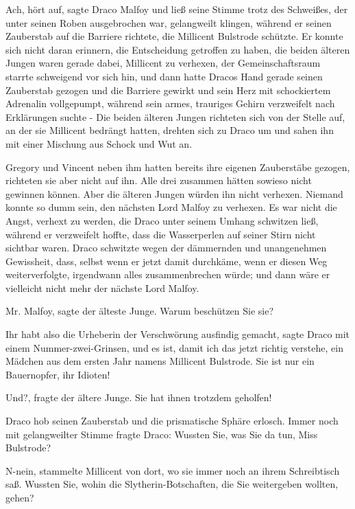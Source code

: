 \glqq{}Ach, hört auf\grqq{}, sagte Draco Malfoy und ließ seine Stimme trotz des
Schweißes, der unter seinen Roben ausgebrochen war, gelangweilt klingen, während
er seinen Zauberstab auf die Barriere richtete, die Millicent Bulstrode
schützte. Er konnte sich nicht daran erinnern, die Entscheidung getroffen zu
haben, die beiden älteren Jungen waren gerade dabei, Millicent zu verhexen, der
Gemeinschaftsraum starrte schweigend vor sich hin, und dann hatte Dracos Hand
gerade seinen Zauberstab gezogen und die Barriere gewirkt und sein Herz mit
schockiertem Adrenalin vollgepumpt, während sein armes, trauriges Gehirn
verzweifelt nach Erklärungen suchte - Die beiden älteren Jungen richteten sich
von der Stelle auf, an der sie Millicent bedrängt hatten, drehten sich zu Draco
um und sahen ihn mit einer Mischung aus Schock und Wut an.

Gregory und Vincent neben ihm hatten bereits ihre eigenen Zauberstäbe gezogen,
richteten sie aber nicht auf ihn. Alle drei zusammen hätten sowieso nicht
gewinnen können. Aber die älteren Jungen würden ihn nicht verhexen. Niemand
konnte so dumm sein, den nächsten Lord Malfoy zu verhexen. Es war nicht die
Angst, verhext zu werden, die Draco unter seinem Umhang schwitzen ließ, während
er verzweifelt hoffte, dass die Wasserperlen auf seiner Stirn nicht sichtbar
waren. Draco schwitzte wegen der dämmernden und unangenehmen Gewissheit, dass,
selbst wenn er jetzt damit durchkäme, wenn er diesen Weg weiterverfolgte,
irgendwann alles zusammenbrechen würde; und dann wäre er vielleicht nicht mehr
der nächste Lord Malfoy.

\glqq{}Mr. Malfoy\grqq{}, sagte der älteste Junge. \glqq{}Warum beschützen Sie
sie?\grqq{}

\glqq{}Ihr habt also die Urheberin der Verschwörung ausfindig gemacht\grqq{},
sagte Draco mit einem Nummer-zwei-Grinsen, \glqq{}und es ist, damit ich das jetzt
richtig verstehe, ein Mädchen aus dem ersten Jahr namens Millicent Bulstrode.
Sie ist nur ein Bauernopfer, ihr Idioten!\grqq{}

\glqq{}Und?\grqq{}, fragte der ältere Junge. \glqq{}Sie hat ihnen trotzdem
geholfen!\grqq{}

Draco hob seinen Zauberstab und die prismatische Sphäre erlosch. Immer noch mit
gelangweilter Stimme fragte Draco: \glqq{}Wussten Sie, was Sie da tun, Miss
Bulstrode?\grqq{}

\glqq{}N-nein\grqq{}, stammelte Millicent von dort, wo sie immer noch an ihrem
Schreibtisch saß. \glqq{}Wussten Sie, wohin die Slytherin-Botschaften, die Sie
weitergeben wollten, gehen?\grqq{}

